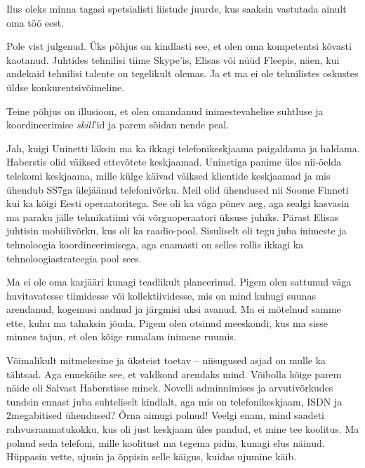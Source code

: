 
Ilus oleks minna tagasi spetsialisti liistude juurde, kus saaksin 
vastutada ainult oma töö eest. 


Pole vist julgenud. Üks põhjus on kindlasti see, et olen oma kompetentsi 
kõvasti kaotanud. Juhtides 
tehnilisi tiime Skype'is, Elisas või nüüd Fleepis, näen, kui andekaid tehnilisi talente on tegelikult olemas. Ja et ma ei ole
tehnilistes oskustes üldse konkurentsivõimeline.


Teine põhjus on illusioon, et olen omandanud inimestevahelise suhtluse ja 
koordineerimise \emph{skill}'id ja 
parem sõidan nende peal.


Jah, kuigi Uninetti läksin ma ka ikkagi telefonikeskjaama paigaldama ja haldama. Haberstis olid väiksed ettevõtete keskjaamad. Uninetiga panime üles nii-öelda telekomi keskjaama, 
mille külge käivad väiksed klientide keskjaamad ja mis 
ühendub SS7ga ülejäänud telefonivõrku. Meil olid ühendused nii Soome 
Finneti kui ka kõigi Eesti operaatoritega. See oli ka väga põnev aeg, aga sealgi kasvasin ma 
paraku jälle tehnikatiimi või võrguoperaatori üksuse 
juhiks. Pärast Elisas juhtisin mobiilivõrku, kus oli ka raadio-pool. 
Sisuliselt oli tegu juba inimeste ja tehnoloogia koordineerimisega, aga enamasti on selles 
rollis ikkagi ka tehnoloogiastrateegia pool sees. 


Ma ei ole oma karjääri kunagi teadlikult planeerinud. Pigem olen sattunud väga huvitavatesse tiimidesse 
või kollektiividesse, mis on mind kuhugi suunas arendanud, 
kogemusi andnud ja järgmisi uksi avanud. Ma ei mõtelnud samme ette, 
kuhu ma tahaksin jõuda. Pigem olen otsinud meeskondi, kus ma 
sisse minnes tajun, et olen kõige rumalam inimene ruumis. 


Võimalikult mitmekesine ja üksteist toetav -- 
niisugused asjad on mulle ka tähtsad. Aga ennekõike see, et valdkond arendaks mind. Võibolla kõige parem 
näide oli Salvast Haberstisse minek. Novelli adminnimises ja 
arvutivõrkudes tundsin ennast juba suhteliselt kindlalt, aga mis on telefonikeskjaam, ISDN ja 2megabitised ühendused? Õrna aimugi 
polnud! Veelgi enam, mind saadeti rahvusraamatukokku, kus oli just keskjaam 
üles pandud, et mine tee koolitus. Ma polnud seda telefoni, mille koolitust ma tegema pidin, kunagi elus näinud. Hüppasin vette, ujusin ja õppisin selle käigus, kuidas ujumine käib. 

